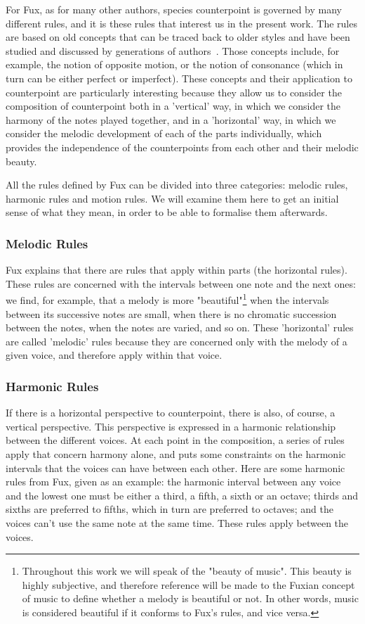 For Fux, as for many other authors, species counterpoint is governed by many different rules, and it is these rules that interest us in the present work. The rules are based on old concepts that can be traced back to older styles and have been studied and discussed by generations of authors~\cite{crocker1962}. Those concepts include, for example, the notion of opposite motion, or the notion of consonance (which in turn can be either perfect or imperfect). These concepts and their application to counterpoint are particularly interesting because they allow us to consider the composition of counterpoint both in a 'vertical' way, in which we consider the harmony of the notes played together, and in a 'horizontal' way, in which we consider the melodic development of each of the parts individually, which provides the independence of the counterpoints from each other and their melodic beauty.


All the rules defined by Fux can be divided into three categories: melodic rules, harmonic rules and motion rules. We will examine them here to get an initial sense of what they mean, in order to be able to formalise them afterwards.

\subsubsection{Melodic Rules}

Fux explains that there are rules that apply within parts (the horizontal rules). These rules are concerned with the intervals between one note and the next ones: we find, for example, that a melody is more "beautiful"\footnote{Throughout this work we will speak of the "beauty of music". This beauty is highly subjective, and therefore reference will be made to the Fuxian concept of music to define whether a melody is beautiful or not. In other words, music is considered beautiful if it conforms to Fux's rules, and vice versa.} when the intervals between its successive notes are small, when there is no chromatic succession between the notes, when the notes are varied, and so on. These 'horizontal' rules are called 'melodic' rules because they are concerned only with the melody of a given voice, and therefore apply within that voice.


\subsubsection{Harmonic Rules}


If there is a horizontal perspective to counterpoint, there is also, of course, a vertical perspective. This perspective is expressed in a harmonic relationship between the different voices. At each point in the composition, a series of rules apply that concern harmony alone, and puts some constraints on the harmonic intervals that the voices can have between each other. Here are some harmonic rules from Fux, given as an example: the harmonic interval between any voice and the lowest one must be either a third, a fifth, a sixth or an octave; thirds and sixths are preferred to fifths, which in turn are preferred to octaves; and the voices can't use the same note at the same time. These rules apply between the voices.

